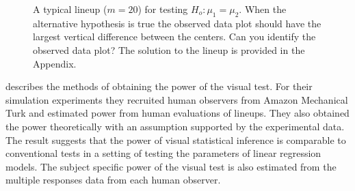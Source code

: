 \begin{figure}[hbtp]
   \centering
      \caption{A typical lineup  ($m = 20$) for testing $H_o: \mu_1 =  \mu_2$. 
      When the alternative hypothesis is true the observed data plot should have the largest vertical difference between the centers. Can you identify the observed data plot? The solution to the lineup is provided in the Appendix.}
      \label{lineup}
\end{figure}



\cite{majumder:2011} describes the methods of obtaining the power of the visual test. For their simulation experiments they recruited human observers from Amazon Mechanical Turk \citep{turk} and estimated power from human evaluations of lineups. They also obtained the power theoretically with an assumption supported by the experimental data. The result suggests that the power of visual statistical inference is comparable to conventional tests in a setting of testing the parameters of linear regression models. The subject specific power of the visual test is also estimated from the multiple responses data from each human observer. 

